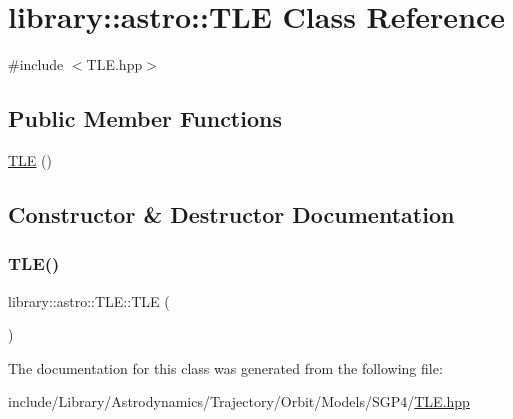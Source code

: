\hypertarget{classlibrary_1_1astro_1_1_t_l_e}{}\section{library\+:\+:astro\+:\+:T\+LE Class Reference}
\label{classlibrary_1_1astro_1_1_t_l_e}


{\ttfamily \#include $<$T\+L\+E.\+hpp$>$}

\subsection*{Public Member Functions}
\begin{DoxyCompactItemize}
\item 
\hyperlink{classlibrary_1_1astro_1_1_t_l_e_a4ff8b885d24b09f555e8449f6e3f10c0}{T\+LE} ()
\end{DoxyCompactItemize}


\subsection{Constructor \& Destructor Documentation}
\mbox{\label{classlibrary_1_1astro_1_1_t_l_e_a4ff8b885d24b09f555e8449f6e3f10c0}} 
\subsubsection{\texorpdfstring{T\+L\+E()}{TLE()}}
{\footnotesize\ttfamily library\+::astro\+::\+T\+L\+E\+::\+T\+LE (\begin{DoxyParamCaption}{ }\end{DoxyParamCaption})}



The documentation for this class was generated from the following file\+:\begin{DoxyCompactItemize}
\item 
include/\+Library/\+Astrodynamics/\+Trajectory/\+Orbit/\+Models/\+S\+G\+P4/\hyperlink{_t_l_e_8hpp}{T\+L\+E.\+hpp}\end{DoxyCompactItemize}
